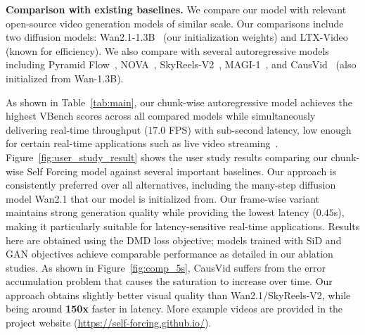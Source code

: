 \documentclass{article}
\begin{document}
\noindent\textbf{Comparison with existing baselines.}
We compare our model with relevant open-source video generation models of similar scale. Our comparisons include two diffusion models: Wan2.1-1.3B~\cite{wang2025wan} (our initialization weights) and LTX-Video~\cite{hacohen2024ltx} (known for efficiency). We also compare with several autoregressive models including Pyramid Flow~\cite{jin2024pyramidal}, NOVA~\cite{deng2024nova}, SkyReels-V2~\cite{chen2025skyreels}, MAGI-1~\cite{magi1}, and CausVid~\cite{yin2025causvid} (also initialized from Wan-1.3B).

As shown in Table~\ref{tab:main}, our chunk-wise autoregressive model achieves the highest VBench scores across all compared models while simultaneously delivering real-time throughput ($17.0$ FPS) with sub-second latency, low enough for certain real-time applications such as live video streaming~\cite{bentaleb2025toward}.
Figure~\ref{fig:user_study_result} shows the user study results comparing our chunk-wise Self Forcing model against several important baselines. Our approach is consistently preferred over all alternatives, including the many-step diffusion model Wan2.1 that our model is initialized from.
Our frame-wise variant maintains strong generation quality while providing the lowest latency ($0.45$s), making it particularly suitable for latency-sensitive real-time applications.
Results here are obtained using the DMD loss objective; models trained with SiD and GAN objectives achieve comparable performance as detailed in our ablation studies.
As shown in Figure~\ref{fig:comp_5s}, CausVid suffers from the error accumulation problem that causes the saturation to increase over time. Our approach obtains slightly better visual quality than Wan2.1/SkyReels-V2, while being around \textbf{150x} faster in latency.
More example videos are provided in the project website (\url{https://self-forcing.github.io/}).
\end{document}
